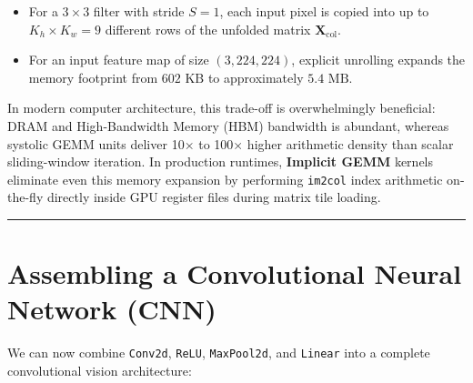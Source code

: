 \documentclass[
  letterpaper,
]{scrbook}
\providecommand{\tightlist}{%
  \setlength{\itemsep}{0pt}\setlength{\parskip}{0pt}}
\begin{document}
\begin{itemize}
\tightlist
\item
  For a \(3 \times 3\) filter with stride \(S = 1\), each input pixel is
  copied into up to \(K_h \times K_w = 9\) different rows of the
  unfolded matrix \(\mathbf{X}_{\text{col}}\).
\item
  For an input feature map of size \((3, 224, 224)\), explicit unrolling
  expands the memory footprint from \(602\text{ KB}\) to approximately
  \textbf{\(5.4\text{ MB}\)}.
\end{itemize}

In modern computer architecture, this trade-off is overwhelmingly
beneficial: DRAM and High-Bandwidth Memory (HBM) bandwidth is abundant,
whereas systolic GEMM units deliver 10× to 100× higher arithmetic
density than scalar sliding-window iteration. In production runtimes,
\textbf{Implicit GEMM} kernels eliminate even this memory expansion by
performing \texttt{im2col} index arithmetic on-the-fly directly inside
GPU register files during matrix tile loading.

\begin{center}\rule{0.5\linewidth}{0.5pt}\end{center}

\section{Assembling a Convolutional Neural Network
(CNN)}\label{assembling-a-convolutional-neural-network-cnn}

We can now combine \texttt{Conv2d}, \texttt{ReLU}, \texttt{MaxPool2d},
and \texttt{Linear} into a complete convolutional vision architecture:
\end{document}
